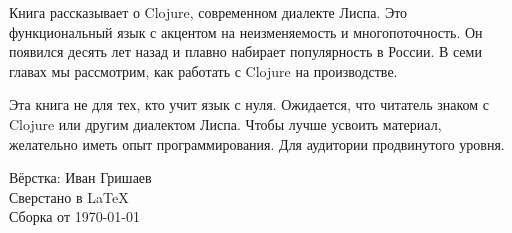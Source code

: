 \thispagestyle{empty}

\small

Книга рассказывает о Clojure, современном диалекте Лиспа. Это функциональный
язык с акцентом на неизменяемость и многопоточность. Он появился десять лет
назад и плавно набирает популярность в России. В семи главах мы рассмотрим, как
работать с Clojure на производстве.

Эта книга не для тех, кто учит язык с нуля. Ожидается, что читатель знаком с
Clojure или другим диалектом Лиспа. Чтобы лучше усвоить материал, желательно
иметь опыт программирования. Для аудитории продвинутого уровня.

\normalfont

\vspace{5em}

\noindent
В\"{е}рстка: Иван Гришаев\\
Сверстано в \LaTeX\\
Сборка от \today
